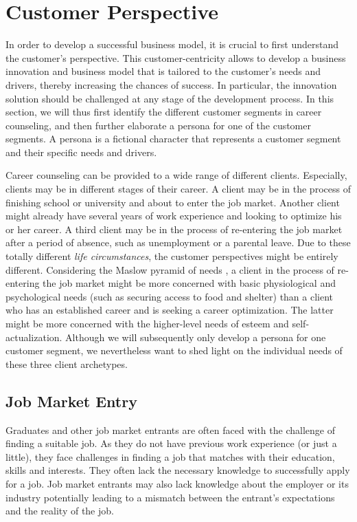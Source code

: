 \section{Customer Perspective}
\label{sec:customer_perspective}

In order to develop a successful business model, it is crucial to first understand the customer's
perspective. This customer-centricity allows to develop a business innovation and business model
that is tailored to the customer's needs and drivers, thereby increasing the chances of success.
In particular, the innovation solution should be challenged at any stage of the development process.
In this section, we will thus first identify the different customer segments in career counseling,
and then further elaborate a persona for one of the customer segments. A persona is a fictional
character that represents a customer segment and their specific needs and drivers.

Career counseling can be provided to a wide range of different clients. Especially, clients may be
in different stages of their career. A client may be in the process of finishing school or university
and about to enter the job market. Another client might already have several years of work experience
and looking to optimize his or her career. A third client may be in the process of re-entering the job
market after a period of absence, such as unemployment or a parental leave. Due to these totally different
\textit{life circumstances}, the customer perspectives might be entirely different. Considering the
Maslow pyramid of needs \citep{maslowTheoryHumanMotivation1943}, a client in the process of re-entering
the job market might be more concerned with basic physiological and psychological needs (such as securing
access to food and shelter) than a client who has an established career and is seeking a career optimization.
The latter might be more concerned with the higher-level needs of esteem and self-actualization. Although
we will subsequently only develop a persona for one customer segment, we nevertheless want to shed light
on the individual needs of these three client archetypes.

\subsection{Job Market Entry}

Graduates and other job market entrants are often faced with the challenge of finding a suitable job. As
they do not have previous work experience (or just a little), they face challenges in finding a job that
matches with their education, skills and interests. They often lack the necessary knowledge to successfully
apply for a job. Job market entrants may also lack knowledge about the employer or its industry potentially
leading to a mismatch between the entrant's expectations and the reality of the job.
\newline


